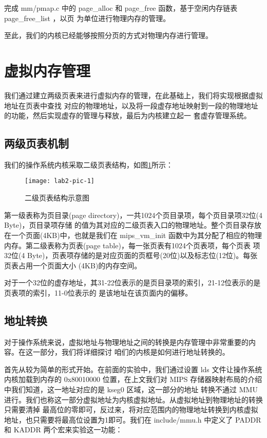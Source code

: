 \begin{exercise}
完成 mm/pmap.c 中的 page\_alloc 和 page\_free 函数，基于空闲内存链表 page\_free\_list ，以页
为单位进行物理内存的管理。
\end{exercise}

至此，我们的内核已经能够按照分页的方式对物理内存进行管理。

\section{虚拟内存管理}

我们通过建立两级页表来进行虚拟内存的管理，在此基础上，我们将实现根据虚拟地址在页表中查找
对应的物理地址，以及将一段虚存地址映射到一段的物理地址的功能，然后实现虚存的管理与释放，最后为内核建立起一
套虚存管理系统。

\subsection{两级页表机制}

我们的操作系统内核采取二级页表结构，如图\ref{lab2-pic-1}所示：

\begin{figure}[htbp]
  \centering
  \texttt{[image: lab2-pic-1]}
  \caption{二级页表结构示意图}\label{lab2-pic-1}
\end{figure}

第一级表称为页目录(page directory)，一共1024个页目录项，每个页目录项32位(4 Byte)，页目录项存储
的值为其对应的二级页表入口的物理地址。整个页目录存放在一个页面(4KB)中，也就是我们在 mips\_vm\_init
函数中为其分配了相应的物理内存。第二级表称为页表(page table)，每一张页表有1024个页表项，每个页表
项32位(4 Byte)，页表项存储的是对应页面的页框号(20位)以及标志位(12位)。每张页表占用一个页面大小
(4KB)的内存空间。

对于一个32位的虚存地址，其31-22位表示的是页目录项的索引，21-12位表示的是页表项的索引，11-0位表示的
是该地址在该页面内的偏移。

\subsection{地址转换}

对于操作系统来说，虚拟地址与物理地址之间的转换是内存管理中非常重要的内容。在这一部分，我们将详细探讨
咱们的内核是如何进行地址转换的。

首先从较为简单的形式开始。在前面的实验中，我们通过设置 lds 文件让操作系统内核加载到内存的 0x80010000
位置，在上文我们对 MIPS 存储器映射布局的介绍中我们知道，这一地址对应的是 kseg0 区域，这一部分的地址
转换不通过 MMU 进行。我们也称这一部分虚拟地址为内核虚拟地址。从虚拟地址到物理地址的转换只需要清掉
最高位的零即可，反过来，将对应范围内的物理地址转换到内核虚拟地址，也只需要将最高位设置为1即可。我们在
 include/mmu.h 中定义了 PADDR 和 KADDR 两个宏来实验这一功能：

